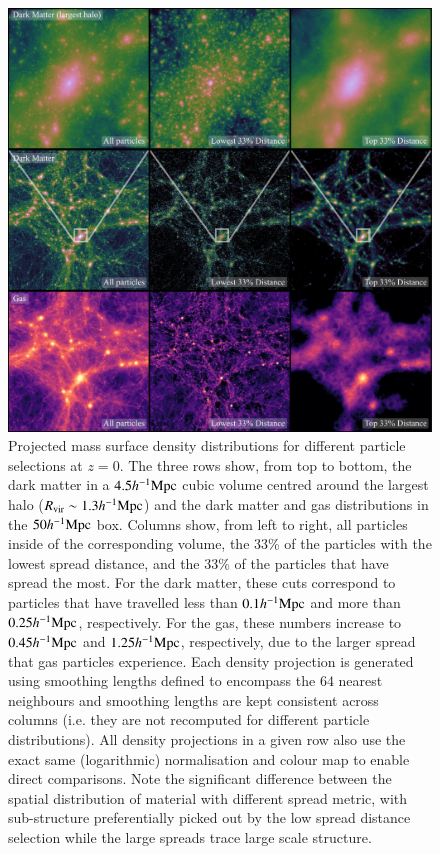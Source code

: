 \begin{figure}
    \centering
    \includegraphics[width=\textwidth]{figures/distance_figures_3.pdf}
    \caption{Projected mass surface density distributions for different
    particle selections at $z=0$. The three rows show, from top to bottom,
    the dark matter in a $4.5h^{-1}{\rm Mpc}{}$ cubic volume centred around the largest
    halo ($R_{\rm vir}\sim 1.3h^{-1}{\rm Mpc}{}$) and the dark matter and gas
    distributions in the $50h^{-1}{\rm Mpc}{}$ box. Columns show, from left to right,
    all particles inside of the corresponding volume, the 33\% of the
    particles with the lowest spread distance, and the 33\% of the particles
    that have spread the most. For the dark matter, these cuts correspond to
    particles that have travelled less than $0.1h^{-1}{\rm Mpc}{}$ and more than
    $0.25h^{-1}{\rm Mpc}{}$, respectively. For the gas, these numbers increase to
    $0.45h^{-1}{\rm Mpc}{}$ and $1.25h^{-1}{\rm Mpc}{}$, respectively, due to the larger spread
    that gas particles experience. Each density projection is generated using
    smoothing lengths defined to encompass the $64$ nearest neighbours and
    smoothing lengths are kept consistent across columns (i.e. they are not
    recomputed for different particle distributions). All density projections
    in a given row also use the exact same (logarithmic) normalisation and
    colour map to enable direct comparisons. Note the significant difference
    between the spatial distribution of material with different spread
    metric, with sub-structure preferentially picked out by the low spread
    distance selection while the large spreads trace large scale structure.
    }
    \vspace{1cm}
    \label{fig:bigdistanceimage}
\end{figure}

